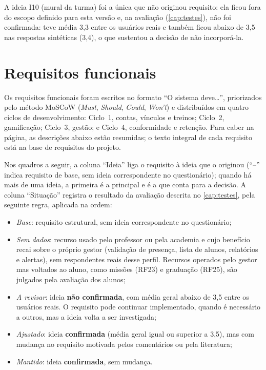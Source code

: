 A ideia I10 (mural da turma) foi a única que não originou requisito: ela
ficou fora do escopo definido para esta versão e, na avaliação
(\autoref{cap:testes}), não foi confirmada: teve média 3,3 entre os
usuários reais e também ficou abaixo de 3,5 nas respostas sintéticas
(3,4), o que sustentou a decisão de não incorporá-la.

\section{Requisitos funcionais}
\label{sec:rf}

Os requisitos funcionais foram escritos no formato ``O sistema deve\ldots'',
priorizados pelo método MoSCoW (\textit{Must}, \textit{Should},
\textit{Could}, \textit{Won't}) e distribuídos em quatro ciclos de
desenvolvimento: Ciclo~1, contas, vínculos e treinos; Ciclo~2,
gamificação; Ciclo~3, gestão; e Ciclo~4, conformidade e retenção. Para
caber na página, as descrições abaixo estão resumidas; o texto integral de
cada requisito está na base de requisitos do projeto.

Nos quadros a seguir, a coluna ``Ideia'' liga o requisito à ideia que o
originou (``--'' indica requisito de base, sem ideia correspondente no
questionário); quando há mais de uma ideia, a primeira é a principal e é
a que conta para a decisão. A coluna ``Situação'' registra o resultado da
avaliação descrita no \autoref{cap:testes}, pela seguinte regra, aplicada
na ordem:

\begin{itemize}
  \item \textit{Base}: requisito estrutural, sem ideia correspondente no
        questionário;
  \item \textit{Sem dados}: recurso usado pelo professor ou pela
        academia e cujo benefício recai sobre o próprio gestor (validação
        de presença, lista de alunos, relatórios e alertas), sem
        respondentes reais desse perfil. Recursos operados pelo gestor mas
        voltados ao aluno, como missões (RF23) e graduação (RF25), são
        julgados pela avaliação dos alunos;
  \item \textit{A revisar}: ideia \textbf{não confirmada}, com média
        geral abaixo de 3,5 entre os usuários reais. O requisito pode
        continuar implementado, quando é necessário a outros, mas a ideia
        volta a ser investigada;
  \item \textit{Ajustado}: ideia \textbf{confirmada} (média geral igual
        ou superior a 3,5), mas com mudança no requisito motivada pelos
        comentários ou pela literatura;
  \item \textit{Mantido}: ideia \textbf{confirmada}, sem mudança.
\end{itemize}

